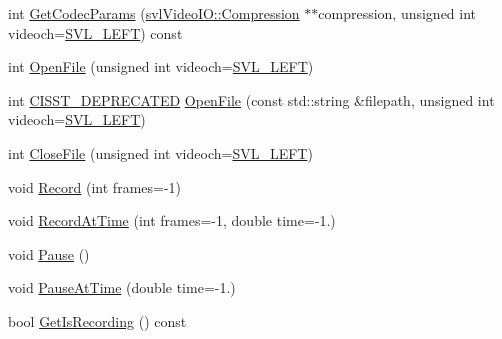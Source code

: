 \begin{DoxyCompactItemize}
\item 
int \hyperlink{classsvl_filter_video_file_writer_a23c048a6a4f6a942ef6e27d27f378fd3}{Get\-Codec\-Params} (\hyperlink{classsvl_video_i_o_a932d071ec9be4fefde824ab9b9125282}{svl\-Video\-I\-O\-::\-Compression} $\ast$$\ast$compression, unsigned int videoch=\hyperlink{svl_definitions_8h_ab9fec7615f19c8df2919eebcab0b187f}{S\-V\-L\-\_\-\-L\-E\-F\-T}) const 
\item 
int \hyperlink{classsvl_filter_video_file_writer_a16915fe55932d252273543e17f759ac1}{Open\-File} (unsigned int videoch=\hyperlink{svl_definitions_8h_ab9fec7615f19c8df2919eebcab0b187f}{S\-V\-L\-\_\-\-L\-E\-F\-T})
\item 
int \hyperlink{cmn_portability_8h_a63da7164735f9501be651b1f2bbc0121}{C\-I\-S\-S\-T\-\_\-\-D\-E\-P\-R\-E\-C\-A\-T\-E\-D} \hyperlink{classsvl_filter_video_file_writer_a15630ad3c0016cb266c9b44310951d53}{Open\-File} (const std\-::string \&filepath, unsigned int videoch=\hyperlink{svl_definitions_8h_ab9fec7615f19c8df2919eebcab0b187f}{S\-V\-L\-\_\-\-L\-E\-F\-T})
\item 
int \hyperlink{classsvl_filter_video_file_writer_a21f6fb227f859747341af2acc0631188}{Close\-File} (unsigned int videoch=\hyperlink{svl_definitions_8h_ab9fec7615f19c8df2919eebcab0b187f}{S\-V\-L\-\_\-\-L\-E\-F\-T})
\item 
void \hyperlink{classsvl_filter_video_file_writer_a2c07c6cc97d15edffdcc2b723eb69cc0}{Record} (int frames=-\/1)
\item 
void \hyperlink{classsvl_filter_video_file_writer_a0f012c2a7cfc7a75c8523dc785416699}{Record\-At\-Time} (int frames=-\/1, double time=-\/1.)
\item 
void \hyperlink{classsvl_filter_video_file_writer_aee6594a4dbe6a8537850f4649710780e}{Pause} ()
\item 
void \hyperlink{classsvl_filter_video_file_writer_a48139523b22e390cbf62aee4774fe33c}{Pause\-At\-Time} (double time=-\/1.)
\item 
bool \hyperlink{classsvl_filter_video_file_writer_a0be6b6136e1df7b4a6b8444deea30753}{Get\-Is\-Recording} () const 
\end{DoxyCompactItemize}
